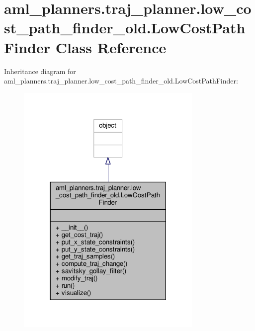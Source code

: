 \hypertarget{classaml__planners_1_1traj__planner_1_1low__cost__path__finder__old_1_1_low_cost_path_finder}{\section{aml\-\_\-planners.\-traj\-\_\-planner.\-low\-\_\-cost\-\_\-path\-\_\-finder\-\_\-old.\-Low\-Cost\-Path\-Finder Class Reference}
\label{classaml__planners_1_1traj__planner_1_1low__cost__path__finder__old_1_1_low_cost_path_finder}
}


Inheritance diagram for aml\-\_\-planners.\-traj\-\_\-planner.\-low\-\_\-cost\-\_\-path\-\_\-finder\-\_\-old.\-Low\-Cost\-Path\-Finder\-:\nopagebreak
\begin{figure}[H]
\begin{center}
\leavevmode
\includegraphics[width=254pt]{classaml__planners_1_1traj__planner_1_1low__cost__path__finder__old_1_1_low_cost_path_finder__inherit__graph}
\end{center}
\end{figure}


